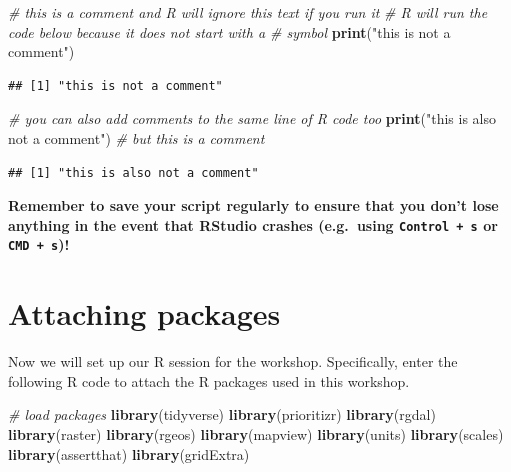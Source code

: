 \documentclass[12pt,]{book}
\newenvironment{Shaded}{\begin{snugshade}}{\end{snugshade}}
\newcommand{\KeywordTok}[1]{\textcolor[rgb]{0.13,0.29,0.53}{\textbf{#1}}}
\newcommand{\StringTok}[1]{\textcolor[rgb]{0.31,0.60,0.02}{#1}}
\newcommand{\CommentTok}[1]{\textcolor[rgb]{0.56,0.35,0.01}{\textit{#1}}}
\newcommand{\NormalTok}[1]{#1}
\begin{document}
\begin{Shaded}
\begin{Highlighting}[]
\CommentTok{# this is a comment and R will ignore this text if you run it}
\CommentTok{# R will run the code below because it does not start with a # symbol}
\KeywordTok{print}\NormalTok{(}\StringTok{"this is not a comment"}\NormalTok{)}
\end{Highlighting}
\end{Shaded}

\begin{verbatim}
## [1] "this is not a comment"
\end{verbatim}

\begin{Shaded}
\begin{Highlighting}[]
\CommentTok{# you can also add comments to the same line of R code too}
\KeywordTok{print}\NormalTok{(}\StringTok{"this is also not a comment"}\NormalTok{) }\CommentTok{# but this is a comment}
\end{Highlighting}
\end{Shaded}

\begin{verbatim}
## [1] "this is also not a comment"
\end{verbatim}

\textbf{Remember to save your script regularly to ensure that you don't
lose anything in the event that RStudio crashes (e.g.~using
\texttt{Control\ +\ s} or \texttt{CMD\ +\ s})!}

\section{Attaching packages}\label{attaching-packages}

Now we will set up our R session for the workshop. Specifically, enter
the following R code to attach the R packages used in this workshop.

\begin{Shaded}
\begin{Highlighting}[]
\CommentTok{# load packages}
\KeywordTok{library}\NormalTok{(tidyverse)}
\KeywordTok{library}\NormalTok{(prioritizr)}
\KeywordTok{library}\NormalTok{(rgdal)}
\KeywordTok{library}\NormalTok{(raster)}
\KeywordTok{library}\NormalTok{(rgeos)}
\KeywordTok{library}\NormalTok{(mapview)}
\KeywordTok{library}\NormalTok{(units)}
\KeywordTok{library}\NormalTok{(scales)}
\KeywordTok{library}\NormalTok{(assertthat)}
\KeywordTok{library}\NormalTok{(gridExtra)}
\end{Highlighting}
\end{Shaded}
\end{document}
